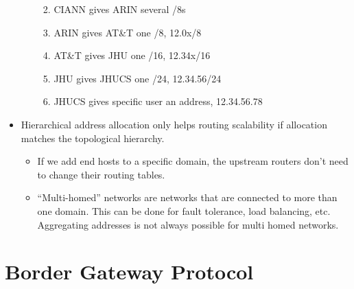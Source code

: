 \documentclass[]{article}
\providecommand{\tightlist}{%
  \setlength{\itemsep}{0pt}\setlength{\parskip}{0pt}}
\begin{document}
\begin{itemize}
\begin{itemize}
    \begin{enumerate}
    \def\labelenumi{\arabic{enumi}.}
    \tightlist
    \item
      CIANN gives ARIN several /8s
    \item
      ARIN gives AT\&T one /8, 12.0x/8
    \item
      AT\&T gives JHU one /16, 12.34x/16
    \item
      JHU gives JHUCS one /24, 12.34.56/24
    \item
      JHUCS gives specific user an address, 12.34.56.78
    \end{enumerate}
  \end{itemize}
\item
  Hierarchical address allocation only helps routing scalability if
  allocation matches the topological hierarchy.

  \begin{itemize}
  \tightlist
  \item
    If we add end hosts to a specific domain, the upstream routers don't
    need to change their routing tables.
  \item
    ``Multi-homed'' networks are networks that are connected to more
    than one domain. This can be done for fault tolerance, load
    balancing, etc. Aggregating addresses is not always possible for
    multi homed networks.
  \end{itemize}
\end{itemize}

\hypertarget{border-gateway-protocol}{%
\section{Border Gateway Protocol}\label{border-gateway-protocol}}
\end{document}
